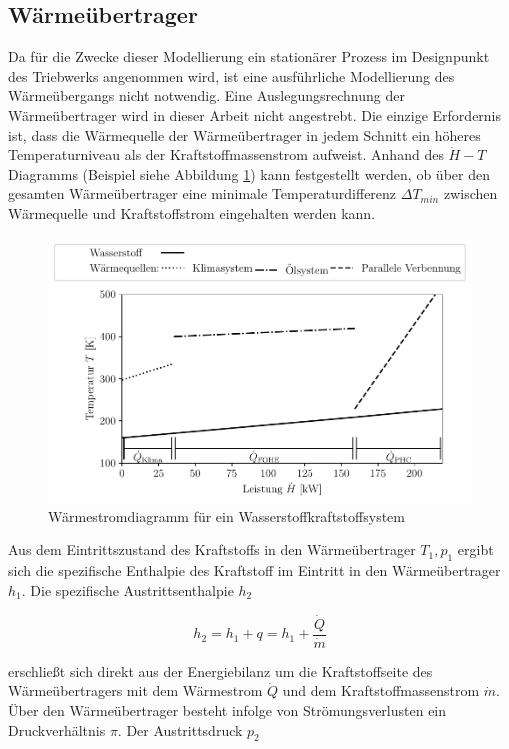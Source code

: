 \subsection{Wärmeübertrager}

Da für die Zwecke dieser Modellierung ein stationärer Prozess im Designpunkt des Triebwerks angenommen wird, ist eine ausführliche Modellierung des Wärmeübergangs nicht notwendig. Eine Auslegungsrechnung der Wärmeübertrager wird in dieser Arbeit nicht angestrebt. Die einzige Erfordernis ist, dass die Wärmequelle der Wärmeübertrager in jedem Schnitt ein höheres Temperaturniveau als der Kraftstoffmassenstrom aufweist. Anhand des $\dot{H}-T$ Diagramms (Beispiel siehe Abbildung \ref{fig:hx}) kann festgestellt werden, ob über den gesamten Wärmeübertrager eine minimale Temperaturdifferenz $\Delta T_{min}$ zwischen Wärmequelle und Kraftstoffstrom eingehalten werden kann.


\begin{figure}[ht]
\centering
\includegraphics[width=1\linewidth]{4_Abbildungen/2_Hauptteil/hx.pdf}
  \caption{Wärmestromdiagramm für ein Wasserstoffkraftstoffsystem}
  \label{fig:hx}
\end{figure}
\FloatBarrier 

 Aus dem Eintrittszustand des Kraftstoffs in den Wärmeübertrager $T_1, p_1$ ergibt sich die spezifische Enthalpie des Kraftstoff im Eintritt in den Wärmeübertrager $h_1$. Die spezifische Austrittsenthalpie $h_2$

\begin{equation}\label{Eq:energy-hx}
	h_2=h_1 +q=h_1+\frac{\dot{Q}}{\dot{m}}
\end{equation}

erschließt sich direkt aus der Energiebilanz um die Kraftstoffseite des Wärmeübertragers mit dem Wärmestrom $\dot{Q}$ und dem Kraftstoffmassenstrom $\dot{m}$. Über den Wärmeübertrager besteht infolge von Strömungsverlusten ein Druckverhältnis $\pi$. Der Austrittsdruck $p_2$


